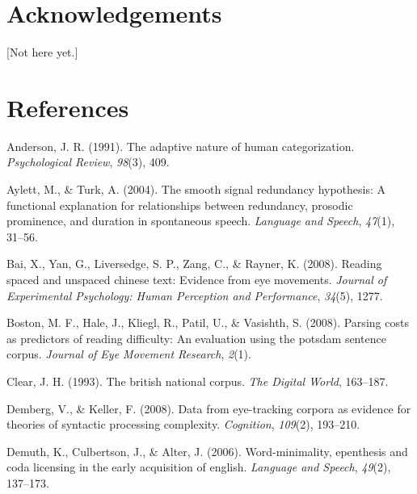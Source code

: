 \documentclass[10pt, letterpaper]{article}
\begin{document}
\hypertarget{acknowledgements}{%
\section{Acknowledgements}\label{acknowledgements}}

{[}Not here yet.{]}

\hypertarget{references}{%
\section{References}\label{references}}

\setlength{\parindent}{-0.1in} 
\setlength{\leftskip}{0.125in}

\noindent

\hypertarget{refs}{}
\leavevmode\hypertarget{ref-anderson1991}{}%
Anderson, J. R. (1991). The adaptive nature of human categorization.
\emph{Psychological Review}, \emph{98}(3), 409.

\leavevmode\hypertarget{ref-aylett2004}{}%
Aylett, M., \& Turk, A. (2004). The smooth signal redundancy hypothesis:
A functional explanation for relationships between redundancy, prosodic
prominence, and duration in spontaneous speech. \emph{Language and
Speech}, \emph{47}(1), 31--56.

\leavevmode\hypertarget{ref-bai2008}{}%
Bai, X., Yan, G., Liversedge, S. P., Zang, C., \& Rayner, K. (2008).
Reading spaced and unspaced chinese text: Evidence from eye movements.
\emph{Journal of Experimental Psychology: Human Perception and
Performance}, \emph{34}(5), 1277.

\leavevmode\hypertarget{ref-boston2008}{}%
Boston, M. F., Hale, J., Kliegl, R., Patil, U., \& Vasishth, S. (2008).
Parsing costs as predictors of reading difficulty: An evaluation using
the potsdam sentence corpus. \emph{Journal of Eye Movement Research},
\emph{2}(1).

\leavevmode\hypertarget{ref-clear1993}{}%
Clear, J. H. (1993). The british national corpus. \emph{The Digital
World}, 163--187.

\leavevmode\hypertarget{ref-demberg2008}{}%
Demberg, V., \& Keller, F. (2008). Data from eye-tracking corpora as
evidence for theories of syntactic processing complexity.
\emph{Cognition}, \emph{109}(2), 193--210.

\leavevmode\hypertarget{ref-demuth2006}{}%
Demuth, K., Culbertson, J., \& Alter, J. (2006). Word-minimality,
epenthesis and coda licensing in the early acquisition of english.
\emph{Language and Speech}, \emph{49}(2), 137--173.
\end{document}
